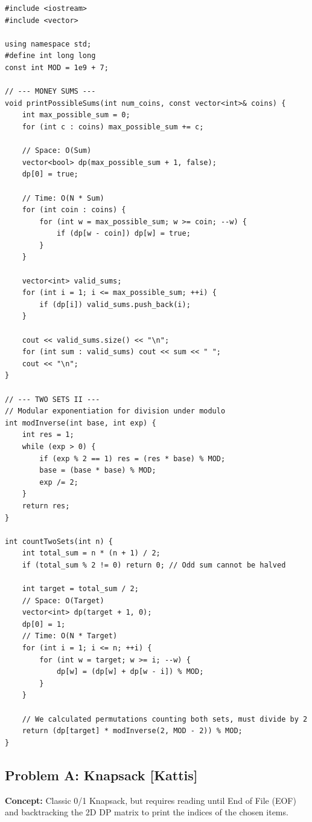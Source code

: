 \begin{lstlisting}
#include <iostream>
#include <vector>

using namespace std;
#define int long long
const int MOD = 1e9 + 7;

// --- MONEY SUMS ---
void printPossibleSums(int num_coins, const vector<int>& coins) {
    int max_possible_sum = 0;
    for (int c : coins) max_possible_sum += c;
    
    // Space: O(Sum)
    vector<bool> dp(max_possible_sum + 1, false);
    dp[0] = true;
    
    // Time: O(N * Sum)
    for (int coin : coins) {
        for (int w = max_possible_sum; w >= coin; --w) {
            if (dp[w - coin]) dp[w] = true;
        }
    }
    
    vector<int> valid_sums;
    for (int i = 1; i <= max_possible_sum; ++i) {
        if (dp[i]) valid_sums.push_back(i);
    }
    
    cout << valid_sums.size() << "\n";
    for (int sum : valid_sums) cout << sum << " ";
    cout << "\n";
}

// --- TWO SETS II ---
// Modular exponentiation for division under modulo
int modInverse(int base, int exp) {
    int res = 1;
    while (exp > 0) {
        if (exp % 2 == 1) res = (res * base) % MOD;
        base = (base * base) % MOD;
        exp /= 2;
    }
    return res;
}

int countTwoSets(int n) {
    int total_sum = n * (n + 1) / 2;
    if (total_sum % 2 != 0) return 0; // Odd sum cannot be halved
    
    int target = total_sum / 2;
    // Space: O(Target)
    vector<int> dp(target + 1, 0);
    dp[0] = 1;
    // Time: O(N * Target)
    for (int i = 1; i <= n; ++i) {
        for (int w = target; w >= i; --w) {
            dp[w] = (dp[w] + dp[w - i]) % MOD;
        }
    }
    
    // We calculated permutations counting both sets, must divide by 2
    return (dp[target] * modInverse(2, MOD - 2)) % MOD;
}
\end{lstlisting}

\subsection{Problem A: Knapsack [Kattis]}
\textbf{Concept:} Classic 0/1 Knapsack, but requires reading until End of File (EOF) and backtracking the 2D DP matrix to print the indices of the chosen items.

